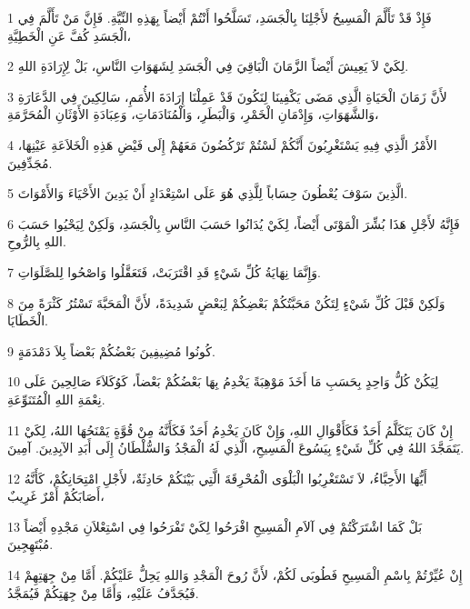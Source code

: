 \par 1 فَإِذْ قَدْ تَأَلَّمَ الْمَسِيحُ لأَجْلِنَا بِالْجَسَدِ، تَسَلَّحُوا أَنْتُمْ أَيْضاً بِهَذِهِ النِّيَّةِ. فَإِنَّ مَنْ تَأَلَّمَ فِي الْجَسَدِ كُفَّ عَنِ الْخَطِيَّةِ،
\par 2 لِكَيْ لاَ يَعِيشَ أَيْضاً الزَّمَانَ الْبَاقِيَ فِي الْجَسَدِ لِشَهَوَاتِ النَّاسِ، بَلْ لِإِرَادَةِ اللهِ.
\par 3 لأَنَّ زَمَانَ الْحَيَاةِ الَّذِي مَضَى يَكْفِينَا لِنَكُونَ قَدْ عَمِلْنَا إِرَادَةَ الأُمَمِ، سَالِكِينَ فِي الدَّعَارَةِ وَالشَّهَوَاتِ، وَإِدْمَانِ الْخَمْرِ، وَالْبَطَرِ، وَالْمُنَادَمَاتِ، وَعِبَادَةِ الأَوْثَانِ الْمُحَرَّمَةِ،
\par 4 الأَمْرُ الَّذِي فِيهِ يَسْتَغْرِبُونَ أَنَّكُمْ لَسْتُمْ تَرْكُضُونَ مَعَهُمْ إِلَى فَيْضِ هَذِهِ الْخَلاَعَةِ عَيْنِهَا، مُجَدِّفِينَ.
\par 5 الَّذِينَ سَوْفَ يُعْطُونَ حِسَاباً لِلَّذِي هُوَ عَلَى اسْتِعْدَادٍ أَنْ يَدِينَ الأَحْيَاءَ وَالأَمْوَاتَ.
\par 6 فَإِنَّهُ لأَجْلِ هَذَا بُشِّرَ الْمَوْتَى أَيْضاً، لِكَيْ يُدَانُوا حَسَبَ النَّاسِ بِالْجَسَدِ، وَلَكِنْ لِيَحْيُوا حَسَبَ اللهِ بِالرُّوحِ.
\par 7 وَإِنَّمَا نِهَايَةُ كُلِّ شَيْءٍ قَدِ اقْتَرَبَتْ، فَتَعَقَّلُوا وَاصْحُوا لِلصَّلَوَاتِ.
\par 8 وَلَكِنْ قَبْلَ كُلِّ شَيْءٍ لِتَكُنْ مَحَبَّتُكُمْ بَعْضِكُمْ لِبَعْضٍ شَدِيدَةً، لأَنَّ الْمَحَبَّةَ تَسْتُرُ كَثْرَةً مِنَ الْخَطَايَا.
\par 9 كُونُوا مُضِيفِينَ بَعْضُكُمْ بَعْضاً بِلاَ دَمْدَمَةٍ.
\par 10 لِيَكُنْ كُلُّ وَاحِدٍ بِحَسَبِ مَا أَخَذَ مَوْهِبَةً يَخْدِمُ بِهَا بَعْضُكُمْ بَعْضاً، كَوُكَلاَءَ صَالِحِينَ عَلَى نِعْمَةِ اللهِ الْمُتَنَوِّعَةِ.
\par 11 إِنْ كَانَ يَتَكَلَّمُ أَحَدٌ فَكَأَقْوَالِ اللهِ، وَإِنْ كَانَ يَخْدِمُ أَحَدٌ فَكَأَنَّهُ مِنْ قُوَّةٍ يَمْنَحُهَا اللهُ، لِكَيْ يَتَمَجَّدَ اللهُ فِي كُلِّ شَيْءٍ بِيَسُوعَ الْمَسِيحِ، الَّذِي لَهُ الْمَجْدُ وَالسُّلْطَانُ إِلَى أَبَدِ الآبِدِينَ. آمِينَ.
\par 12 أَيُّهَا الأَحِبَّاءُ، لاَ تَسْتَغْرِبُوا الْبَلْوَى الْمُحْرِقَةَ الَّتِي بَيْنَكُمْ حَادِثَةٌ، لأَجْلِ امْتِحَانِكُمْ، كَأَنَّهُ أَصَابَكُمْ أَمْرٌ غَرِيبٌ،
\par 13 بَلْ كَمَا اشْتَرَكْتُمْ فِي آلاَمِ الْمَسِيحِ افْرَحُوا لِكَيْ تَفْرَحُوا فِي اسْتِعْلاَنِ مَجْدِهِ أَيْضاً مُبْتَهِجِينَ.
\par 14 إِنْ عُيِّرْتُمْ بِاسْمِ الْمَسِيحِ فَطُوبَى لَكُمْ، لأَنَّ رُوحَ الْمَجْدِ وَاللهِ يَحِلُّ عَلَيْكُمْ. أَمَّا مِنْ جِهَتِهِمْ فَيُجَدَّفُ عَلَيْهِ، وَأَمَّا مِنْ جِهَتِكُمْ فَيُمَجَّدُ.
